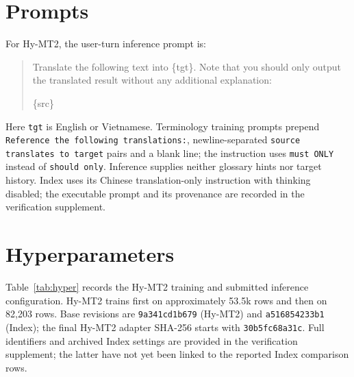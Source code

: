 \documentclass[11pt]{article}
\begin{document}


\appendix
\section{Prompts}\label{app:prompts}
For Hy-MT2, the user-turn inference prompt is:
\begin{quote}\small\ttfamily\raggedright
Translate the following text into \{tgt\}. Note that you should only output the translated result without any additional explanation:\par\medskip
\{src\}
\end{quote}
Here \texttt{tgt} is English or Vietnamese. Terminology training prompts prepend \texttt{Reference the following translations:}, newline-separated \texttt{source translates to target} pairs and a blank line; the instruction uses \texttt{must ONLY} instead of \texttt{should only}. Inference supplies neither glossary hints nor target history. Index uses its Chinese translation-only instruction with thinking disabled; the executable prompt and its provenance are recorded in the verification supplement.

\section{Hyperparameters}\label{app:hyper}
Table~\ref{tab:hyper} records the Hy-MT2 training and submitted inference configuration. Hy-MT2 trains first on approximately 53.5k rows and then on 82,203 rows. Base revisions are \texttt{9a341cd1b679} (Hy-MT2) and \texttt{a516854233b1} (Index); the final Hy-MT2 adapter SHA-256 starts with \texttt{30b5fc68a31c}. Full identifiers and archived Index settings are provided in the verification supplement; the latter have not yet been linked to the reported Index comparison rows.
\end{document}
